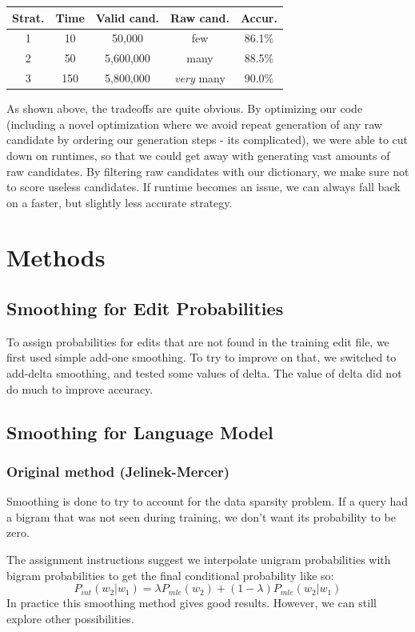 \documentclass[10pt,twocolumn]{article}
\begin{document}
\begin{table}[ht]
\begin{tabular}{| c | c | c | c | c |}
\hline
Strat. & Time & Valid cand. & Raw cand. & Accur.\\\hline
1 & 10 & 50,000 & few & 86.1\%\\\hline
2 & 50 & 5,600,000 & many & 88.5\%\\\hline
3 & 150 & 5,800,000 & {\it very} many & 90.0\%\\\hline
\end{tabular}
\end{table}

As shown above, the tradeoffs are quite obvious. By optimizing our code (including a novel optimization where we avoid repeat generation of any raw candidate by ordering our generation steps - its complicated), we were able to cut down on runtimes, so that we could get away with generating vast amounts of raw candidates. By filtering raw candidates with our dictionary, we make sure not to score useless candidates. If runtime becomes an issue, we can always fall back on a faster, but slightly less accurate strategy.
\section{Methods}
\subsection{Smoothing for Edit Probabilities}
To assign probabilities for edits that are not found in the training edit file, we first used simple add-one smoothing. To try to improve on that, we switched to add-delta smoothing, and tested some values of delta. The value of delta did not do much to improve accuracy.

\subsection{Smoothing for Language Model}
\subsubsection{Original method (Jelinek-Mercer)}
Smoothing is done to try to account for the data sparsity problem. If a query had a bigram that was not seen during training, we don't want its probability to be zero.

The assignment instructions suggest we interpolate unigram probabilities with bigram probabilities to get the final conditional probability like so:
\begin{equation*}
P_{int}(w_2|w_1) = \lambda P_{mle}(w_2) + (1-\lambda)P_{mle}(w_2|w_1)
\end{equation*}
In practice this smoothing method gives good results. However, we can still explore other possibilities.
\end{document}
